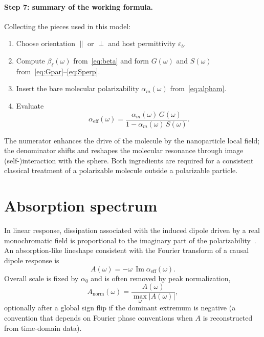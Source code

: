 \documentclass[11pt,a4paper]{article}
\begin{document}
\paragraph{Step 7: summary of the working formula.}
Collecting the pieces used in this model:
\begin{enumerate}[leftmargin=1.4em]
  \item Choose orientation $\parallel$ or $\perp$ and host permittivity
        $\varepsilon_b$.
  \item Compute $\beta_\ell(\omega)$ from~\eqref{eq:beta} and form
        $G(\omega)$ and $S(\omega)$ from~\eqref{eq:Gpar}--\eqref{eq:Sperp}.
  \item Insert the bare molecular polarizability $\alpha_m(\omega)$
        from~\eqref{eq:alpham}.
  \item Evaluate
        \[
          \alpha_{\mathrm{eff}}(\omega)
          =
          \frac{\alpha_m(\omega)\, G(\omega)}{1-\alpha_m(\omega)\, S(\omega)}.
        \]
\end{enumerate}
The numerator enhances the drive of the molecule by the nanoparticle local field;
the denominator shifts and reshapes the molecular resonance through image
(self-)interaction with the sphere.  Both ingredients are required for a consistent
classical treatment of a polarizable molecule outside a polarizable particle.

\section{Absorption spectrum}
\label{sec:abs}

In linear response, dissipation associated with the induced dipole driven by a
real monochromatic field is proportional to the imaginary part of the
polarizability~\citep{jackson1999,novotny2012}.  An absorption-like lineshape consistent with the Fourier
transform of a causal dipole response is
\begin{equation}
  A(\omega)
  =
  -\omega\,
  \operatorname{Im}
  \alpha_{\mathrm{eff}}(\omega).
  \label{eq:A}
\end{equation}
Overall scale is fixed by $\alpha_0$ and is often removed by peak normalization,
\begin{equation}
  A_{\mathrm{norm}}(\omega)
  =
  \frac{A(\omega)}{\max_{\omega}|A(\omega)|},
\end{equation}
optionally after a global sign flip if the dominant extremum is negative (a
convention that depends on Fourier phase conventions when $A$ is reconstructed
from time-domain data).\\
\end{document}
